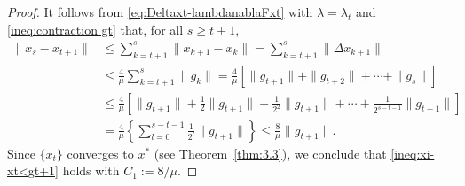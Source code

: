 \documentclass[10pt,a4paper]{amsart}
\begin{document}
\begin{proof}
It follows from \eqref{eq:Deltaxt-lambdanablaFxt}  with $\lambda=\lambda_t$ and \eqref{ineq:contraction gt} that, for all $s\geq t+1$,
\begin{align*}
\|x_s-x_{t+1}\|&\leq \sum_{k=t+1}^s\|x_{k+1}-x_{k}\|=\sum_{k=t+1}^s\|\Delta x_{k+1}\|\nonumber\\
&\leq \frac{4}{\mu}\sum_{k=t+1}^s\|g_k\|=\frac{4}{\mu}\left[\|g_{t+1}\|+\|g_{t+2}\|+\cdots+ \|g_{s}\|\right]\nonumber\\
&\leq \frac{4}{\mu}\left[\|g_{t+1}\|+\frac{1}{2}\|g_{t+1}\|+\frac{1}{2^2}\|g_{t+1}\|+\cdots+ \frac{1}{2^{s-t-1}}\|g_{t+1}\|\right]\nonumber\\
&=\frac{4}{\mu}\left\{\sum_{l=0}^{s-t-1}\frac{1}{2^l}\|g_{t+1}\|\right\}\leq \frac{8}{\mu}\|g_{t+1}\|.
\end{align*}
Since  $\{x_t\}$ converges to $x^*$ (see Theorem~\ref{thm:3.3}), we conclude that \eqref{ineq:xi-xt<gt+1} holds with $C_1:=8/\mu.$
 


\end{proof}
\end{document}
